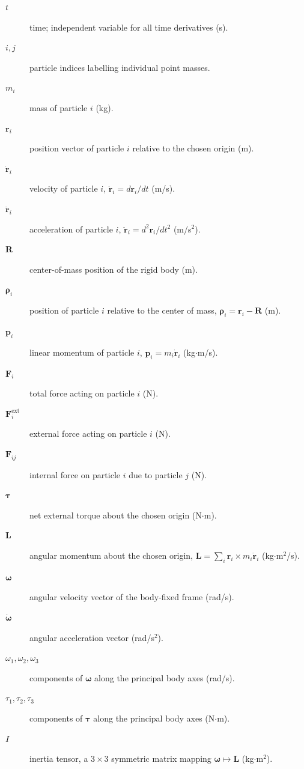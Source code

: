 \documentclass[a4paper,11pt]{article}
\begin{document}
\begin{description}
  \item[\(t\)] time; independent variable for all time derivatives (s).
  \item[\(i,j\)] particle indices labelling individual point masses.
  \item[\(m_i\)] mass of particle \(i\) (kg).
  \item[\(\mathbf r_i\)] position vector of particle \(i\) relative to the chosen origin (m).
  \item[\(\dot{\mathbf r}_i\)] velocity of particle \(i\), \(\dot{\mathbf r}_i = d\mathbf r_i/dt\) (m/s).
  \item[\(\ddot{\mathbf r}_i\)] acceleration of particle \(i\), \(\ddot{\mathbf r}_i = d^2\mathbf r_i/dt^2\) (m/s\(^2\)).
  \item[\(\mathbf R\)] center-of-mass position of the rigid body (m).
  \item[\(\boldsymbol\rho_i\)] position of particle \(i\) relative to the center of
  mass, \(\boldsymbol\rho_i = \mathbf r_i - \mathbf R\) (m).
  \item[\(\mathbf p_i\)] linear momentum of particle \(i\), \(\mathbf p_i = m_i\dot{\mathbf r}_i\) (kg\(\cdot\)m/s).
  \item[\(\mathbf F_i\)] total force acting on particle \(i\) (N).
  \item[\(\mathbf F_i^{\mathrm{ext}}\)] external force acting on particle \(i\) (N).
  \item[\(\mathbf F_{ij}\)] internal force on particle \(i\) due to particle \(j\) (N).
  \item[\(\boldsymbol\tau\)] net external torque about the chosen origin (N\(\cdot\)m).
  \item[\(\mathbf L\)] angular momentum about the chosen origin, \(\mathbf L = \sum_i \mathbf r_i \times m_i\dot{\mathbf r}_i\) (kg\(\cdot\)m\(^2\)/s).
  \item[\(\boldsymbol\omega\)] angular velocity vector of the body-fixed frame (rad/s).
  \item[\(\dot{\boldsymbol\omega}\)] angular acceleration vector (rad/s\(^2\)).
  \item[\(\omega_1,\omega_2,\omega_3\)] components of \(\boldsymbol\omega\) along the principal body axes (rad/s).
  \item[\(\tau_1,\tau_2,\tau_3\)] components of \(\boldsymbol\tau\) along the principal body axes (N\(\cdot\)m).
  \item[\(I\)] inertia tensor, a \(3\times3\) symmetric matrix mapping \(\boldsymbol\omega \mapsto \mathbf L\) (kg\(\cdot\)m\(^2\)).

\end{description}
\end{document}
